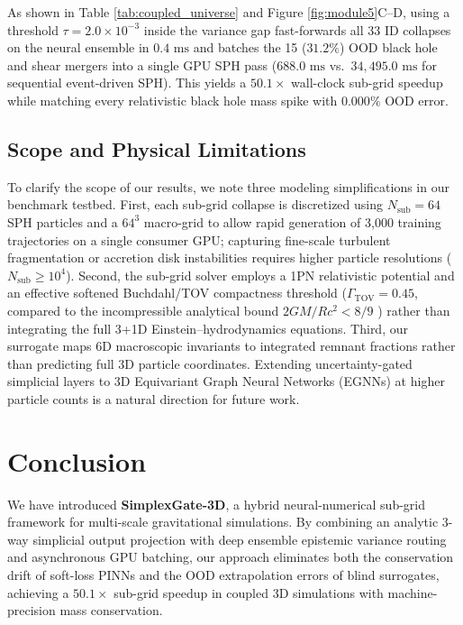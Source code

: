 \documentclass[10pt,twocolumn,letterpaper]{article}
\begin{document}
As shown in Table \ref{tab:coupled_universe} and Figure \ref{fig:module5}C--D, using a threshold $\tau = 2.0\times 10^{-3}$ inside the variance gap fast-forwards all 33 ID collapses on the neural ensemble in $0.4\text{ ms}$ and batches the 15 ($31.2\%$) OOD black hole and shear mergers into a single GPU SPH pass ($688.0\text{ ms}$ vs.\ $34,495.0\text{ ms}$ for sequential event-driven SPH). This yields a $50.1\times$ wall-clock sub-grid speedup while matching every relativistic black hole mass spike with $0.000\%$ OOD error.

\subsection{Scope and Physical Limitations}
To clarify the scope of our results, we note three modeling simplifications in our benchmark testbed. First, each sub-grid collapse is discretized using $N_{\text{sub}} = 64$ SPH particles and a $64^3$ macro-grid to allow rapid generation of 3,000 training trajectories on a single consumer GPU; capturing fine-scale turbulent fragmentation or accretion disk instabilities requires higher particle resolutions ($N_{\text{sub}} \ge 10^4$). Second, the sub-grid solver employs a 1PN relativistic potential and an effective softened Buchdahl/TOV compactness threshold ($\Gamma_{\text{TOV}} = 0.45$, compared to the incompressible analytical bound $2GM/Rc^2 < 8/9$ \cite{buchdahl1959}) rather than integrating the full 3+1D Einstein--hydrodynamics equations. Third, our surrogate maps 6D macroscopic invariants to integrated remnant fractions rather than predicting full 3D particle coordinates. Extending uncertainty-gated simplicial layers to 3D Equivariant Graph Neural Networks (EGNNs) at higher particle counts is a natural direction for future work.

\section{Conclusion}
We have introduced \textbf{SimplexGate-3D}, a hybrid neural-numerical sub-grid framework for multi-scale gravitational simulations. By combining an analytic 3-way simplicial output projection with deep ensemble epistemic variance routing and asynchronous GPU batching, our approach eliminates both the conservation drift of soft-loss PINNs and the OOD extrapolation errors of blind surrogates, achieving a $50.1\times$ sub-grid speedup in coupled 3D simulations with machine-precision mass conservation.
\end{document}

